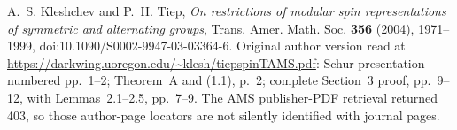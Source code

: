 A.~S. Kleshchev and P.~H. Tiep,
\emph{On restrictions of modular spin representations of symmetric
and alternating groups}, Trans. Amer. Math. Soc. \textbf{356} (2004),
1971--1999, doi:10.1090/S0002-9947-03-03364-6.
Original author version read at
\url{https://darkwing.uoregon.edu/~klesh/tiepspinTAMS.pdf}:
Schur presentation numbered pp.~1--2; Theorem~A and (1.1), p.~2;
complete Section~3 proof, pp.~9--12, with Lemmas~2.1--2.5,
pp.~7--9.  The AMS publisher-PDF retrieval returned 403, so those
author-page locators are not silently identified with journal pages.
